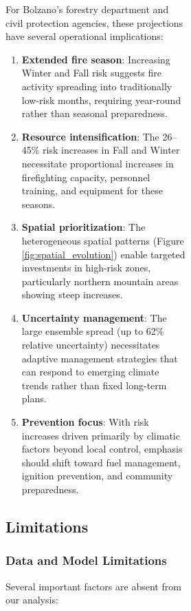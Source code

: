 \documentclass[11pt,a4paper]{article}
\begin{document}
\begin{figure}[H]
\begin{figure}[H]
\begin{figure}[H]
For Bolzano's forestry department and civil protection agencies, these projections have several operational implications:

\begin{enumerate}
    \item \textbf{Extended fire season}: Increasing Winter and Fall risk suggests fire activity spreading into traditionally low-risk months, requiring year-round rather than seasonal preparedness.
    \item \textbf{Resource intensification}: The 26--45\% risk increases in Fall and Winter necessitate proportional increases in firefighting capacity, personnel training, and equipment for these seasons.
    \item \textbf{Spatial prioritization}: The heterogeneous spatial patterns (Figure \ref{fig:spatial_evolution}) enable targeted investments in high-risk zones, particularly northern mountain areas showing steep increases.
    \item \textbf{Uncertainty management}: The large ensemble spread (up to 62\% relative uncertainty) necessitates adaptive management strategies that can respond to emerging climate trends rather than fixed long-term plans.
    \item \textbf{Prevention focus}: With risk increases driven primarily by climatic factors beyond local control, emphasis should shift toward fuel management, ignition prevention, and community preparedness.
\end{enumerate}

\subsection{Limitations}

\subsubsection{Data and Model Limitations}

Several important factors are absent from our analysis:


\end{figure}
\end{figure}
\end{figure}
\end{document}
